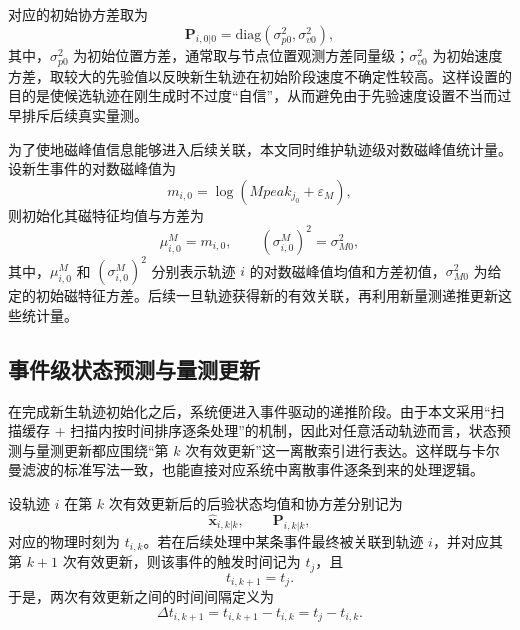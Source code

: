 \documentclass{xdupgthesis}
\begin{document}
对应的初始协方差取为
\begin{equation}
	\mathbf P_{i,0|0}
	=
	\mathrm{diag}\left(\sigma_{p0}^{2},\sigma_{v0}^{2}\right),
	\label{eq:ch3_init_cov}
\end{equation}
其中，$\sigma_{p0}^{2}$ 为初始位置方差，通常取与节点位置观测方差同量级；$\sigma_{v0}^{2}$ 为初始速度方差，取较大的先验值以反映新生轨迹在初始阶段速度不确定性较高。这样设置的目的是使候选轨迹在刚生成时不过度“自信”，从而避免由于先验速度设置不当而过早排斥后续真实量测。

为了使地磁峰值信息能够进入后续关联，本文同时维护轨迹级对数磁峰值统计量。设新生事件的对数磁峰值为
\begin{equation}
	m_{i,0}=\log(Mpeak_{j_0}+\varepsilon_M),
	\label{eq:ch3_init_mag}
\end{equation}
则初始化其磁特征均值与方差为
\begin{equation}
	\mu_{i,0}^{M}=m_{i,0},
	\qquad
	(\sigma_{i,0}^{M})^{2}=\sigma_{M0}^{2},
	\label{eq:ch3_init_mag_stat}
\end{equation}
其中，$\mu_{i,0}^{M}$ 和 $(\sigma_{i,0}^{M})^{2}$ 分别表示轨迹 $i$ 的对数磁峰值均值和方差初值，$\sigma_{M0}^{2}$ 为给定的初始磁特征方差。后续一旦轨迹获得新的有效关联，再利用新量测递推更新这些统计量。

\subsection{事件级状态预测与量测更新}

在完成新生轨迹初始化之后，系统便进入事件驱动的递推阶段。由于本文采用“扫描缓存 + 扫描内按时间排序逐条处理”的机制，因此对任意活动轨迹而言，状态预测与量测更新都应围绕“第 $k$ 次有效更新”这一离散索引进行表达。这样既与卡尔曼滤波的标准写法一致，也能直接对应系统中离散事件逐条到来的处理逻辑。

设轨迹 $i$ 在第 $k$ 次有效更新后的后验状态均值和协方差分别记为
\begin{equation}
	\hat{\mathbf x}_{i,k|k},
	\qquad
	\mathbf P_{i,k|k},
	\label{eq:ch3_post_k}
\end{equation}
对应的物理时刻为 $t_{i,k}$。若在后续处理中某条事件最终被关联到轨迹 $i$，并对应其第 $k+1$ 次有效更新，则该事件的触发时间记为 $t_j$，且
\begin{equation}
	t_{i,k+1}=t_j.
	\label{eq:ch3_update_time}
\end{equation}
于是，两次有效更新之间的时间间隔定义为
\begin{equation}
	\Delta t_{i,k+1}=t_{i,k+1}-t_{i,k}=t_j-t_{i,k}.
	\label{eq:ch3_dt_event}
\end{equation}
\end{document}
